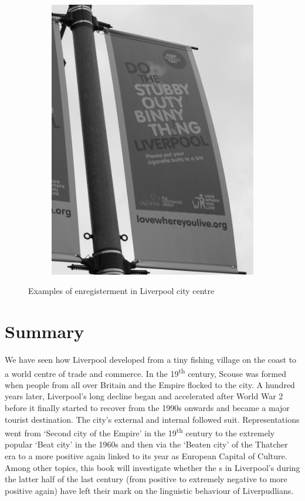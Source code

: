 \begin{figure}[h]
\begin{subfigure}[h]{0.45\textwidth}
				\includegraphics[width=\textwidth]{figures/stubby}
			\end{subfigure}
		\caption{Examples of enregisterment in Liverpool city centre}
		\label{fig.posters}
	\end{figure}

\section{Summary}\label{sec.hist.con}

We have seen how Liverpool developed from a tiny fishing village on the  coast to a world centre of trade and commerce.
In the 19\textsuperscript{th} century, Scouse was formed when people from all over Britain and the Empire flocked to the city.
A hundred years later, Liverpool's long decline began and accelerated after World War 2 before it finally started to recover from the 1990s onwards and became a major tourist destination.
The city's external and internal  followed suit.
Representations went from `Second city of the Empire' in the 19\textsuperscript{th} century to the extremely popular `Beat city' in the 1960s and then via the `Beaten city' of the Thatcher era to a more positive  again linked to its year as European Capital of Culture.
Among other topics, this book will investigate whether the s in Liverpool's  during the latter half of the last century (from positive to extremely negative to more positive again) have left their mark on the linguistic behaviour of Liverpudlians.
